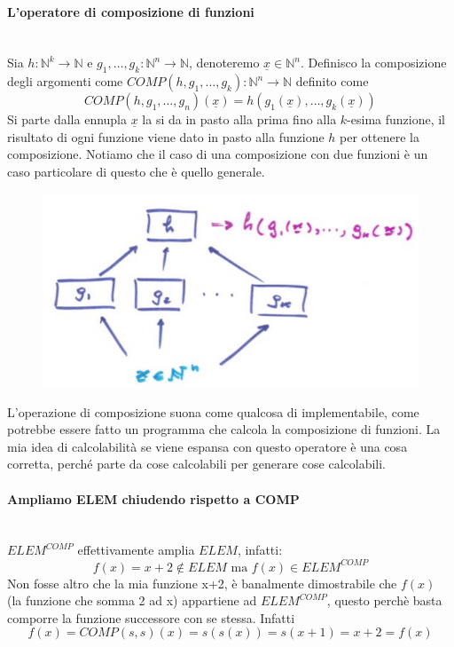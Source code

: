 \documentclass{article}
\begin{document}
\paragraph{L'operatore di composizione di funzioni}\mbox{}\\
Sia $h:\mathbb{N}^k\rightarrow\mathbb{N}$ e $g_1,\dots,g_k:\mathbb{N}^n\rightarrow\mathbb{N}$,
denoteremo $\underline{x}\in\mathbb{N}^n$.
Definisco la composizione degli argomenti come $COMP(h,g_1,\dots,g_k):\mathbb{N}^n\rightarrow\mathbb{N}$
definito come
$$COMP(h,g_1,\dots,g_n)(\underline{x})=h(g_1(\underline{x}),\dots,g_k(\underline{x}))$$
Si parte dalla ennupla $\underline{x}$ la si da in pasto alla prima fino alla $k$-esima funzione,
il risultato di ogni funzione viene dato in pasto alla funzione $h$ per ottenere la composizione.
Notiamo che il caso di una composizione con due funzioni è un caso particolare di questo che è
quello generale.
\begin{figure}[H]
    \centering
    \includegraphics[scale=0.5]{images/composizione_ooperazine.png}
\end{figure}
L'operazione di composizione suona come qualcosa di implementabile, come potrebbe essere
fatto un programma che calcola la composizione di funzioni. La mia idea di calcolabilità
se viene espansa con questo operatore è una cosa corretta, perché parte da cose calcolabili
per generare cose calcolabili.
\paragraph{Ampliamo ELEM chiudendo rispetto a COMP}\mbox{}\\
$ELEM^{COMP}$ effettivamente amplia $ELEM$, infatti:
$$f(x)=x+2\notin ELEM\text{ ma }f(x)\in ELEM^{COMP}$$
Non fosse altro che la mia funzione x+2, è banalmente dimostrabile che $f(x)$ (la funzione
che somma 2 ad x) appartiene ad $ELEM^{COMP}$, questo perchè basta
comporre la funzione successore con se stessa. Infatti $$f(x)=COMP(s,s)(x)=s(s(x))=s(x+1)=x+2=f(x)$$
\end{document}

